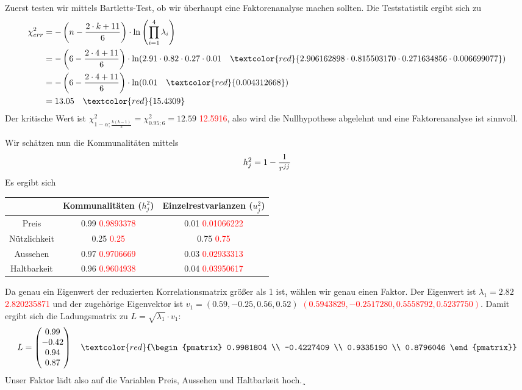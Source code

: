 \documentclass{article}
\begin{document}
	Zuerst testen wir mittels Bartletts-Test, ob wir überhaupt eine Faktorenanalyse machen sollten. Die Teststatistik ergibt sich zu
	\begin{align}
		\chi^2_{err} &= -\left(n-\frac{2\cdot k+11}{6}\right)\cdot\ln\left(\prod_{i=1}^{4} \lambda_i\right) \notag \\
		&= -\left(6-\frac{2\cdot 4+11}{6}\right) \cdot\ln(2.91\cdot 0.82\cdot 0.27 \cdot 0.01 \quad\textcolor{red}{2.906162898\cdot 0.815503170 \cdot 0.271634856 \cdot 0.006699077}) \notag \\
		&= -\left(6-\frac{2\cdot 4+11}{6}\right) \cdot\ln(0.01 \quad\textcolor{red}{0.004312668}) \notag \\
		&= 13.05 \quad\textcolor{red}{15.4309} \notag
	\end{align}
	Der kritische Wert ist $\chi^2_{1-\alpha;\frac{k(k-1)}{2}}=\chi^2_{0.95;6}=12.59$ \textcolor{red}{12.5916}, also wird die Nullhypothese abgelehnt und eine Faktorenanalyse ist sinnvoll.
	
	Wir schätzen nun die Kommunalitäten mittels
	\begin{align}
		h_j^2 = 1-\frac{1}{r^{jj}} \notag
	\end{align}
	Es ergibt sich
	\begin{center}
		\begin{tabular}{c|cc}
			& \textbf{Kommunalitäten ($h_j^2$)} & \textbf{Einzelrestvarianzen ($u_j^2$)} \\
			\hline
			Preis & 0.99 \textcolor{red}{0.9893378} & 0.01 \textcolor{red}{0.01066222} \\
			Nützlichkeit & 0.25 \textcolor{red}{0.25} & 0.75 \textcolor{red}{0.75} \\
			Aussehen & 0.97 \textcolor{red}{0.9706669} & 0.03 \textcolor{red}{0.02933313} \\
			Haltbarkeit & 0.96 \textcolor{red}{0.9604938} & 0.04 \textcolor{red}{0.03950617}
		\end{tabular}
	\end{center}
	
	Da genau ein Eigenwert der reduzierten Korrelationsmatrix größer als 1 ist, wählen wir genau einen Faktor. Der Eigenwert ist $\lambda_1 = 2.82$ \textcolor{red}{2.820235871} und der zugehörige Eigenvektor ist $v_1=(0.59,-0.25,0.56,0.52)$ \textcolor{red}{$(0.5943829, -0.2517280, 0.5558792, 0.5237750)$}. Damit ergibt sich die Ladungsmatrix zu $L=\sqrt{\lambda_1}\cdot v_1$:
	\begin{align}
		L = \begin{pmatrix}
			0.99 \\
			-0.42 \\
			0.94 \\
			0.87
		\end{pmatrix} \quad\textcolor{red}{\begin{pmatrix}
			0.9981804 \\
			-0.4227409 \\
			0.9335190 \\
			0.8796046
		\end{pmatrix}} \notag
	\end{align}
	Unser Faktor lädt also auf die Variablen Preis, Aussehen und Haltbarkeit hoch.¸
\end{document}
